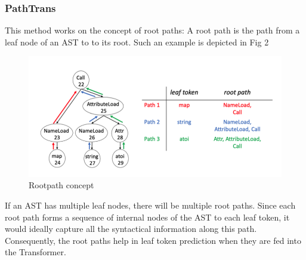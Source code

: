 \documentclass[sigplan,screen,9pt]{acmart}
\begin{document}
\subsubsection{PathTrans}
This method works on the concept of root paths: A root path is the path from a leaf node of an AST to to its root. Such an example is depicted in Fig 2
\begin{figure}[h]
  \centering
  \includegraphics[width=\linewidth]{figs/rootpath.png}
  \caption{Rootpath concept}
\end{figure}
If an AST has multiple leaf nodes, there will be multiple root paths. Since each root path forms a sequence of internal nodes of the AST to each leaf token, it would ideally capture all the syntactical information along this path. Consequently, the root paths help in leaf token prediction when they are fed into the Transformer.
\end{document}
